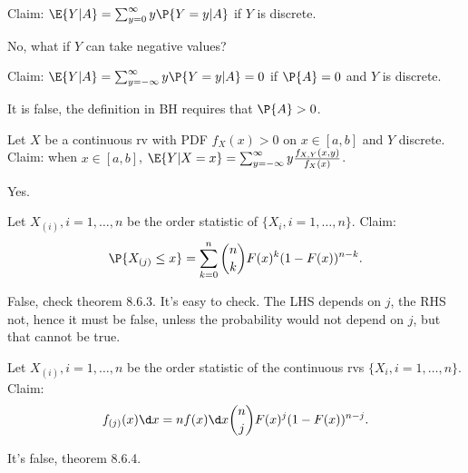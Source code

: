 \documentclass[tf-tutorial-all.tex]{subfiles}
\begin{document}
\begin{truefalse}
Claim: $\E{Y|A} = \sum_{y=0}^{\infty} y \P{Y=y|A}$  if $Y$ is discrete.

\begin{solution}
No, what if $Y$ can take negative values?
\end{solution}
\end{truefalse}

\begin{truefalse}
Claim: $\E{Y|A} = \sum_{y=-\infty}^{\infty} y \P{Y=y|A} = 0$  if $\P{A}=0$ and $Y$ is discrete.

\begin{solution}
It is false, the definition in BH requires that $\P{A}>0$.
\end{solution}
\end{truefalse}


\begin{truefalse}
Let $X$ be a continuous rv with PDF $f_{X}(x) > 0$ on $x\in[a, b]$ and $Y$ discrete.
Claim: when $x\in [a, b]$, $\E{Y|X=x} = \sum_{y=-\infty}^{\infty} y \frac{f_{X,Y}(x,y)}{f_{X}(x)}$.

\begin{solution}
Yes.
\end{solution}
\end{truefalse}

\begin{truefalse}
Let $X_{(i)}, i = 1, \ldots, n$ be the order statistic of $\{X_{i}, i=1, \ldots, n\}$.
Claim:
\begin{equation*}
\P{X_{(j)}\leq x} = \sum_{k=0}^{n}{n \choose k} F(x)^k (1-F(x))^{n-k}.
\end{equation*}

\begin{solution}
False, check theorem 8.6.3.
It's easy to check.
The LHS depends on $j$, the RHS not, hence it must be false, unless the probability would not depend on $j$, but that cannot be true.
\end{solution}
\end{truefalse}


\begin{truefalse}
Let $X_{(i)}, i = 1, \ldots, n$ be the order statistic of the continuous rvs $\{X_{i}, i=1, \ldots, n\}$.
Claim:
\begin{equation*}
f_{(j)}(x) \d x = n f(x) \d x {n \choose j} F(x)^j (1-F(x))^{n-j}.
\end{equation*}
\begin{solution}
It's false, theorem 8.6.4.
\end{solution}
\end{truefalse}
\end{document}
